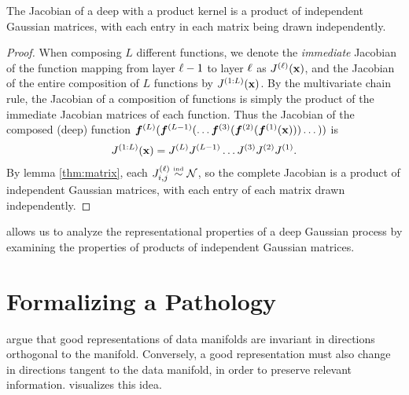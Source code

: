 \begin{theorem}
\label{thm:prodjacob}
The Jacobian of a deep \gp{} with a product kernel is a product of independent Gaussian matrices, with each entry in each matrix being drawn independently.
\end{theorem}
%
\begin{proof}
When composing $L$ different functions, we denote the \emph{immediate} Jacobian of the function mapping from layer $\ell -1$ to layer $\ell$ as $J^{(\ell)}({\bf{x}})$, and the Jacobian of the entire composition of $L$ functions by $J^{(1:L)}({\bf{x}})$.
%
By the multivariate chain rule, the Jacobian of a composition of functions is simply the product of the immediate Jacobian matrices of each function.  
%
Thus the Jacobian of the composed (deep) function $\boldsymbol{f}^{(L)}(\boldsymbol{f}^{(L-1)}(\dots \boldsymbol{f}^{(3)}( \boldsymbol{f}^{(2)}( \boldsymbol{f}^{(1)}({\bf{x}})))\dots))$ is
%
%
\begin{align}
 J^{(1:L)}({\bf{x}}) 
= J^{(L)} J^{(L-1)} \dots J^{(3)} J^{(2)} J^{(1)}.
\label{eq:jacobian-of-deep-gp}
\end{align}
%
By lemma \ref{thm:matrix}, each ${J^{(\ell)}_{i,j} \overset{\mbox{\tiny \textnormal{ind}}}{\sim} \mathcal{N}}$, so the complete Jacobian is a product of independent Gaussian matrices, with each entry of each matrix drawn independently.
\end{proof}

 allows us to analyze the representational properties of a deep Gaussian process by examining the properties of products of independent Gaussian matrices.






\section{Formalizing a Pathology}
\label{sec:formalizing-pathology}

\citet{rifai2011higher} argue that good representations of data manifolds are invariant in directions orthogonal to the manifold.
Conversely, a good representation must also change in directions tangent to the data manifold, in order to preserve relevant information.
 visualizes this idea.

